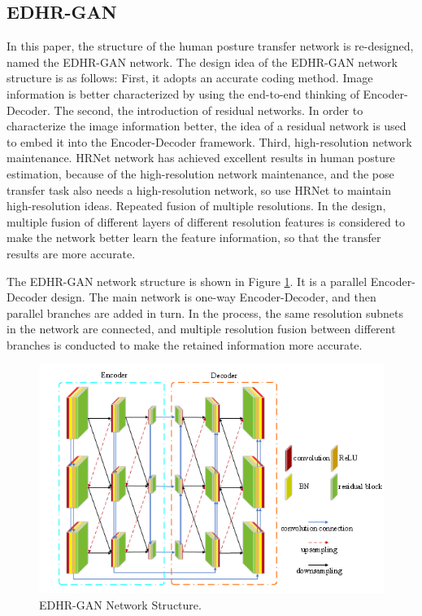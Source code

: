 \subsection{EDHR-GAN}
	
In this paper, the structure of the human posture transfer network is re-designed, named the EDHR-GAN network. The design idea of the EDHR-GAN network structure is as follows: First, it adopts an accurate coding method. Image information is better characterized by using the end-to-end thinking of Encoder-Decoder. The second, the introduction of residual networks. In order to characterize the image information better, the idea of a residual network is used to embed it into the Encoder-Decoder framework. Third, high-resolution network maintenance. HRNet network has achieved excellent results in human posture estimation, because of the high-resolution network maintenance, and the pose transfer task also needs a high-resolution network, so use HRNet to maintain high-resolution ideas. Repeated fusion of multiple resolutions. In the design, multiple fusion of different layers of different resolution features is considered to make the network better learn the feature information, so that the transfer results are more accurate.
	
The EDHR-GAN network structure is shown in Figure \ref{image04}. It is a parallel Encoder-Decoder design. The main network is one-way Encoder-Decoder, and then parallel branches are added in turn. In the process, the same resolution subnets in the network are connected, and multiple resolution fusion between different branches is conducted to make the retained information more accurate.
	
\begin{figure}
	\centering
	\includegraphics[scale=1]{image04.png}
	\caption{EDHR-GAN Network Structure.}
	\label{image04}
\end{figure}
	
